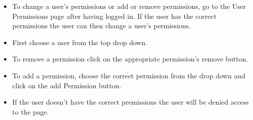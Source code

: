 \begin{itemize}
\begin{itemize}
				\item To change a user's permissions or add or remove permissions, go to the User Permissions page after having logged in. If the user has the correct permissions the user can then change a user's permissions.
				\item First choose a user from the top drop down.
				\item To remove a permission click on the appropriate permission's remove button.
				\item To add a permission, choose the correct permission from the drop down and click on the add Permission button.
				\item If the user doesn't have the correct premissions the user will be denied access to the page.
			\end{itemize}
	\end{itemize}